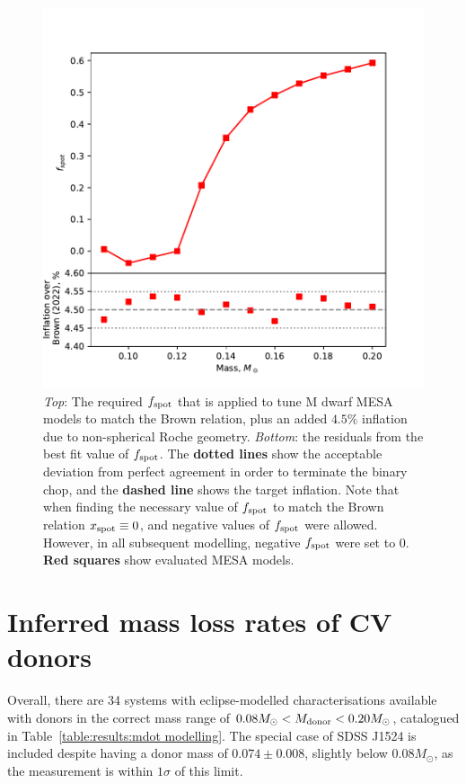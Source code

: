 \begin{figure}
    \centering
    \includegraphics[width=\textwidth]{figures/modelling/fspot_relation_to_match_brown_plus_4.5.pdf}
    \caption{{\it Top}: The required $f_{\rm spot}$ that is applied to tune M dwarf MESA models to match the Brown relation, plus an added $4.5\%$ inflation due to non-spherical Roche geometry. {\it Bottom}: the residuals from the best fit value of $f_{\rm spot}$. The {\bf dotted lines} show the acceptable deviation from perfect agreement in order to terminate the binary chop, and the {\bf dashed line} shows the target inflation. Note that when finding the necessary value of $f_{\rm spot}$ to match the Brown relation $x_{\rm spot} \equiv 0$, and negative values of $f_{\rm spot}$ were allowed. However, in all subsequent modelling, negative $f_{\rm spot}$ were set to 0. {\bf Red squares} show evaluated MESA models.}
    \label{fig:modelling:fspot mass relationship}
\end{figure}



\section{Inferred mass loss rates of CV donors}
\label{sect:modelling:donor mass loss rates}

Overall, there are 34 systems with eclipse-modelled characterisations available with donors in the correct mass range of $0.08 M_\odot < M_{\rm donor} < 0.20 M_\odot$, catalogued in Table~\ref{table:results:mdot modelling}.
The special case of SDSS J1524 is included despite having a donor mass of $0.074\pm0.008$, slightly below $0.08 M_\odot$, as the measurement is within $1\sigma$ of this limit.

